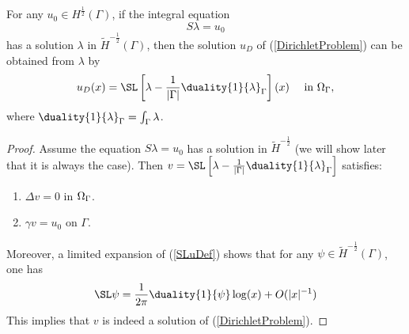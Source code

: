 \documentclass[10pt,a4paper]{article}
\begin{document}
\begin{The}
	For any $u_0 \in H^{\frac{1}{2}}(\Gamma)$, if the integral equation
	\begin{equation}
		S \lambda = u_0
		\label{eqIntDirichlet}
	\end{equation}
	has a solution $\lambda$ in $\tilde{H}^{-\frac{1}{2}}(\Gamma)$, then the solution $u_D$ of (\ref{DirichletProblem}) can be obtained from $\lambda$ by
	\begin{equation}
		u_D(x) =	\SL \left[\lambda - \frac{1}{|\Gamma|}\duality{1}{\lambda}_{\Gamma}\right](x)  \quad \text{ in } \Omegam,
	\end{equation}
	where $\duality{1}{\lambda}_{\Gamma} = \int_{\Gamma} \lambda$. 
	\begin{proof}
		Assume the equation $S\lambda = u_0$ has a solution in $\tilde{H}^{-\frac{1}{2}}$ (we will show later that it is always the case). Then $v= \SL \left[\lambda - \frac{1}{|\Gamma|}\duality{1}{\lambda}_{\Gamma}\right]$ satisfies: 
		\begin{enumerate}
			\item $\Delta v = 0$ in $\Omega_\Gamma$. 
			\item $\gamma v = u_0$ on $\Gamma$.  
		\end{enumerate}
		Moreover, a limited expansion of (\ref{SLuDef}) shows that for any $\psi \in \tilde{H}^{-\frac{1}{2}}(\Gamma)$, one has
		\[\SL \psi = \frac{1}{2\pi} \duality{1}{\psi}\log(x) + O(|x|^{-1})\] 
		This implies that $v$ is indeed a solution of (\ref{DirichletProblem}). 
	\end{proof}
\end{The}
\end{document}
